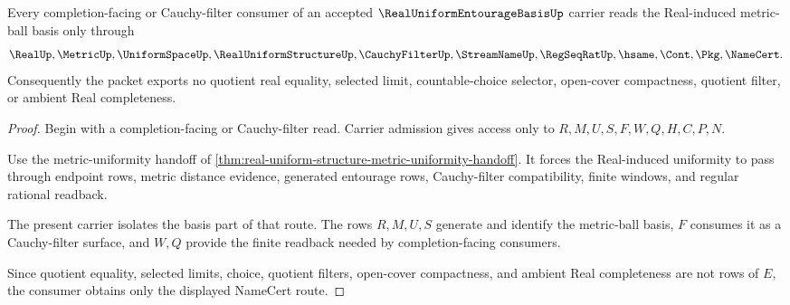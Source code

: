 \begin{theorem}
\label{thm:real-uniform-entourage-basis-cauchy-filter-handoff}
Every completion-facing or Cauchy-filter consumer of an accepted $\RealUniformEntourageBasisUp$ carrier reads the Real-induced metric-ball basis only through
$$
\RealUp,\MetricUp,\UniformSpaceUp,\RealUniformStructureUp,\CauchyFilterUp,\StreamNameUp,\RegSeqRatUp,\hsame,\Cont,\Pkg,\NameCert .
$$
Consequently the packet exports no quotient real equality, selected limit, countable-choice selector, open-cover compactness, quotient filter, or ambient Real completeness.
\end{theorem}
\begin{proof}
Begin with a completion-facing or Cauchy-filter read. Carrier admission gives access only to $R,M,U,S,F,W,Q,H,C,P,N$.

Use the metric-uniformity handoff of \autoref{thm:real-uniform-structure-metric-uniformity-handoff}. It forces the Real-induced uniformity to pass through endpoint rows, metric distance evidence, generated entourage rows, Cauchy-filter compatibility, finite windows, and regular rational readback.

The present carrier isolates the basis part of that route. The rows $R,M,U,S$ generate and identify the metric-ball basis, $F$ consumes it as a Cauchy-filter surface, and $W,Q$ provide the finite readback needed by completion-facing consumers.

Since quotient equality, selected limits, choice, quotient filters, open-cover compactness, and ambient Real completeness are not rows of $E$, the consumer obtains only the displayed NameCert route.
\end{proof}



